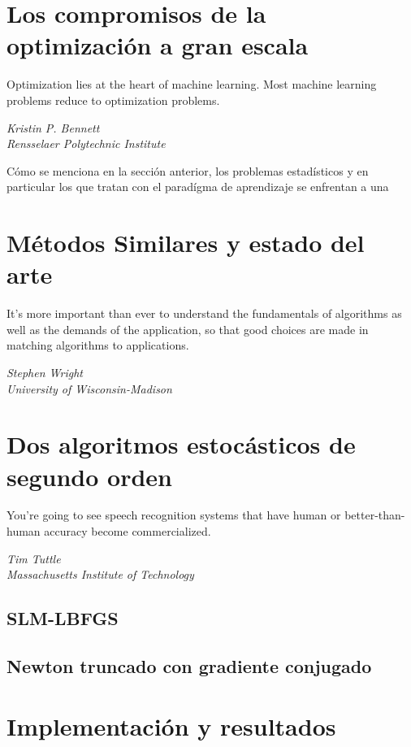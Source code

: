 \documentclass{book}
\theoremstyle{plain}
\theoremstyle{definition}
\theoremstyle{remark}
\begin{document}


\chapter{Los compromisos de la optimización a gran escala}



\epigraph{Optimization lies at the heart of machine learning. Most machine learning problems reduce
to optimization problems.}{\textit{Kristin P. Bennett \\ Rensselaer Polytechnic Institute}}
\newpage


Cómo se menciona en la sección anterior, los problemas estadísticos y en particular los que tratan con el paradígma de aprendizaje se enfrentan a una 

\chapter{Métodos Similares y estado del arte}

\epigraph{It’s more important than ever to understand the fundamentals of
algorithms as well as the demands of the application, so that good
choices are made in matching algorithms to applications.}{\textit{Stephen Wright \\ University of Wisconsin-Madison}}
\newpage


\chapter{Dos algoritmos estocásticos de segundo orden}

\epigraph{You're going to see speech recognition systems that have human or better-than-human accuracy become commercialized.}{\textit{Tim Tuttle \\ Massachusetts Institute of Technology}}

\newpage

\section{SLM-LBFGS}

\section{Newton truncado con gradiente conjugado}

\chapter{Implementación y resultados}
\end{document}
